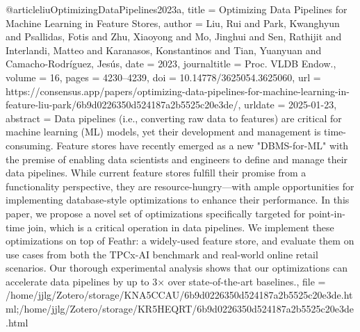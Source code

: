 {{{{@article{liuOptimizingDataPipelines2023a,
  title = {Optimizing {{Data Pipelines}} for {{Machine Learning}} in {{Feature Stores}}},
  author = {Liu, Rui and Park, Kwanghyun and Psallidas, Fotis and Zhu, Xiaoyong and Mo, Jinghui and Sen, Rathijit and Interlandi, Matteo and Karanasos, Konstantinos and Tian, Yuanyuan and Camacho-Rodríguez, Jesús},
  date = {2023},
  journaltitle = {Proc. VLDB Endow.},
  volume = {16},
  pages = {4230--4239},
  doi = {10.14778/3625054.3625060},
  url = {https://consensus.app/papers/optimizing-data-pipelines-for-machine-learning-in-feature-liu-park/6b9d0226350d524187a2b5525c20e3de/},
  urldate = {2025-01-23},
  abstract = {Data pipelines (i.e., converting raw data to features) are critical for machine learning (ML) models, yet their development and management is time-consuming. Feature stores have recently emerged as a new "DBMS-for-ML" with the premise of enabling data scientists and engineers to define and manage their data pipelines. While current feature stores fulfill their promise from a functionality perspective, they are resource-hungry---with ample opportunities for implementing database-style optimizations to enhance their performance. In this paper, we propose a novel set of optimizations specifically targeted for point-in-time join, which is a critical operation in data pipelines. We implement these optimizations on top of Feathr: a widely-used feature store, and evaluate them on use cases from both the TPCx-AI benchmark and real-world online retail scenarios. Our thorough experimental analysis shows that our optimizations can accelerate data pipelines by up to 3× over state-of-the-art baselines.},
  file = {/home/jjlg/Zotero/storage/KNA5CCAU/6b9d0226350d524187a2b5525c20e3de.html;/home/jjlg/Zotero/storage/KR5HEQRT/6b9d0226350d524187a2b5525c20e3de.html}
}

}}}}
